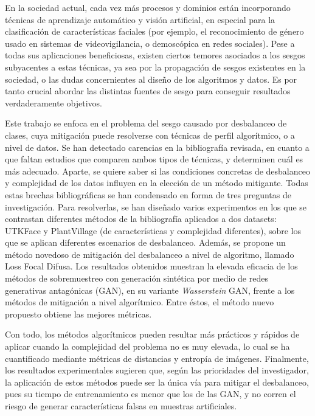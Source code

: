 En la sociedad actual, cada vez más procesos y dominios están incorporando técnicas de aprendizaje automático y visión artificial, en especial para la clasificación de características faciales (por ejemplo, el reconocimiento de género usado en sistemas de videovigilancia, o demoscópica en redes sociales). Pese a todas sus aplicaciones beneficiosas, existen ciertos temores asociados a los sesgos subyacentes a estas técnicas, ya sea por la propagación de sesgos existentes en la sociedad, o las dudas concernientes al diseño de los algoritmos y datos. Es por tanto crucial abordar las distintas fuentes de sesgo para conseguir resultados verdaderamente objetivos.

Este trabajo se enfoca en el problema del sesgo causado por desbalanceo de clases, cuya mitigación puede resolverse con técnicas de perfil algorítmico, o a nivel de datos. Se han detectado carencias en la bibliografía revisada, en cuanto a que faltan estudios que comparen ambos tipos de técnicas, y determinen cuál es más adecuado. Aparte, se quiere saber si las condiciones concretas de desbalanceo y complejidad de los datos influyen en la elección de un método mitigante. Todas estas brechas bibliográficas se han condensado en forma de tres preguntas de investigación. Para resolverlas, se han diseñado varios experimentos en los que se contrastan diferentes métodos de la bibliografía aplicados a dos datasets: UTKFace y PlantVillage (de características y complejidad diferentes), sobre los que se aplican diferentes escenarios de desbalanceo. Además, se propone un método novedoso de mitigación del desbalanceo a nivel de algoritmo, llamado Loss Focal Difusa. Los resultados obtenidos muestran la elevada eficacia de los métodos de sobremuestreo con generación sintética por medio de redes generativas antagónicas (GAN), en su variante \textit{Wasserstein} GAN, frente a los métodos de mitigación a nivel algorítmico. Entre éstos, el método nuevo propuesto obtiene las mejores métricas.

Con todo, los métodos algorítmicos pueden resultar más prácticos y rápidos de aplicar cuando la complejidad del problema no es muy elevada, lo cual se ha cuantificado mediante métricas de distancias y entropía de imágenes. Finalmente, los resultados experimentales sugieren que, según las prioridades del investigador, la aplicación de estos métodos puede ser la única vía para mitigar el desbalanceo, pues su tiempo de entrenamiento es menor que los de las GAN, y no corren el riesgo de generar características falsas en muestras artificiales.


